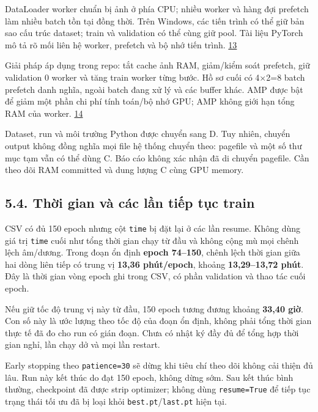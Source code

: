 \documentclass[
  vietnamese,
  12pt,
  a4paper,
]{article}
\begin{document}
DataLoader worker chuẩn bị ảnh ở phía CPU; nhiều worker và hàng đợi
prefetch làm nhiều batch tồn tại đồng thời. Trên Windows, các tiến trình
có thể giữ bản sao cấu trúc dataset; train và validation có thể cùng giữ
pool. Tài liệu PyTorch mô tả rõ mối liên hệ worker, prefetch và bộ nhớ
tiến trình. \href{https://docs.pytorch.org/docs/2.8/data.html}{13}

Giải pháp áp dụng trong repo: tắt cache ảnh RAM, giảm/kiểm soát
prefetch, giữ validation 0 worker và tăng train worker từng bước. Hồ sơ
cuối có 4×2=8 batch prefetch danh nghĩa, ngoài batch đang xử lý và các
buffer khác. AMP được bật để giảm một phần chi phí tính toán/bộ nhớ GPU;
AMP không giới hạn tổng RAM của worker.
\href{https://docs.pytorch.org/docs/2.8/amp.html}{14}

Dataset, run và môi trường Python được chuyển sang D. Tuy nhiên, chuyển
output không đồng nghĩa mọi file hệ thống chuyển theo: pagefile và một
số thư mục tạm vẫn có thể dùng C. Báo cáo không xác nhận đã di chuyển
pagefile. Cần theo dõi RAM committed và dung lượng C cùng GPU memory.

\subsection{5.4. Thời gian và các lần tiếp tục
train}\label{thux1eddi-gian-vuxe0-cuxe1c-lux1ea7n-tiux1ebfp-tux1ee5c-train}

CSV có đủ 150 epoch nhưng cột
\texttt{t\allowbreak{}i\allowbreak{}m\allowbreak{}e\allowbreak{}} bị đặt
lại ở các lần resume. Không dùng giá trị
\texttt{t\allowbreak{}i\allowbreak{}m\allowbreak{}e\allowbreak{}} cuối
như tổng thời gian chạy từ đầu và không cộng mù mọi chênh lệch âm/dương.
Trong đoạn ổn định \textbf{epoch 74--150}, chênh lệch thời gian giữa hai
dòng liên tiếp có trung vị \textbf{13,36 phút/epoch}, khoảng
\textbf{13,29--13,72 phút}. Đây là thời gian vòng epoch ghi trong CSV,
có phần validation và thao tác cuối epoch.

Nếu giữ tốc độ trung vị này từ đầu, 150 epoch tương đương khoảng
\textbf{33,40 giờ}. Con số này là ước lượng theo tốc độ của đoạn ổn
định, không phải tổng thời gian thực tế đã đo cho run có gián đoạn. Chưa
có nhật ký đầy đủ để tổng hợp thời gian nghỉ, lần chạy dở và mọi lần
restart.

Early stopping theo
\texttt{p\allowbreak{}a\allowbreak{}t\allowbreak{}i\allowbreak{}e\allowbreak{}n\allowbreak{}c\allowbreak{}e\allowbreak{}=\allowbreak{}3\allowbreak{}0\allowbreak{}}
sẽ dừng khi tiêu chí theo dõi không cải thiện đủ lâu. Run này kết thúc
do đạt 150 epoch, không dừng sớm. Sau kết thúc bình thường, checkpoint
đã được strip optimizer; không dùng
\texttt{r\allowbreak{}e\allowbreak{}s\allowbreak{}u\allowbreak{}m\allowbreak{}e\allowbreak{}=\allowbreak{}T\allowbreak{}r\allowbreak{}u\allowbreak{}e\allowbreak{}}
để tiếp tục trạng thái tối ưu đã bị loại khỏi
\texttt{b\allowbreak{}e\allowbreak{}s\allowbreak{}t\allowbreak{}.\allowbreak{}p\allowbreak{}t\allowbreak{}}/\texttt{l\allowbreak{}a\allowbreak{}s\allowbreak{}t\allowbreak{}.\allowbreak{}p\allowbreak{}t\allowbreak{}}
hiện tại.
\end{document}
